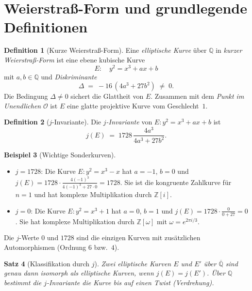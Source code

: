 \documentclass[12pt,a4paper]{amsart}
\newtheorem{theorem}{Satz}[section]
\theoremstyle{definition}
\newtheorem{definition}[theorem]{Definition}
\newtheorem{example}[theorem]{Beispiel}
\newcommand{\Z}{\mathbb{Z}}
\newcommand{\Q}{\mathbb{Q}}
\begin{document}
\section{Weierstra\ss-Form und grundlegende Definitionen}

\begin{definition}[Kurze Weierstra\ss-Form]
\label{def:weierstrass}
Eine \emph{elliptische Kurve} \"uber $\Q$ in \emph{kurzer Weierstra\ss-Form} ist
eine ebene kubische Kurve
\[
  E: \quad y^2 = x^3 + ax + b
\]
mit $a, b \in \Q$ und \emph{Diskriminante}
\[
  \Delta \;=\; -16\,(4a^3 + 27b^2) \;\ne\; 0.
\]
Die Bedingung $\Delta \ne 0$ sichert die Glattheit von $E$.
Zusammen mit dem \emph{Punkt im Unendlichen} $\mathcal{O}$ ist $E$ eine
glatte projektive Kurve vom Geschlecht~$1$.
\end{definition}

\begin{definition}[$j$-Invariante]
\label{def:j_invariant}
Die \emph{$j$-Invariante} von $E: y^2 = x^3 + ax + b$ ist
\[
  j(E) \;=\; 1728\,\frac{4a^3}{4a^3 + 27b^2}.
\]
\end{definition}

\begin{example}[Wichtige Sonderkurven]
\label{ex:special_curves}
\begin{itemize}
  \item $j = 1728$: Die Kurve $E\colon y^2 = x^3 - x$ hat $a = -1$, $b = 0$
    und $j(E) = 1728 \cdot \frac{4(-1)^3}{4(-1)^3 + 27\cdot 0} = 1728$.
    Sie ist die kongruente Zahlkurve f\"ur $n=1$ und hat komplexe Multiplikation
    durch $\Z[i]$.
  \item $j = 0$: Die Kurve $E\colon y^2 = x^3 + 1$ hat $a = 0$, $b = 1$
    und $j(E) = 1728 \cdot \frac{0}{0 + 27} = 0$.
    Sie hat komplexe Multiplikation durch $\Z[\omega]$ mit $\omega = e^{2\pi i/3}$.
\end{itemize}
Die $j$-Werte $0$ und $1728$ sind die einzigen Kurven mit zus\"atzlichen
Automorphismen (Ordnung $6$ bzw.\ $4$).
\end{example}

\begin{theorem}[Klassifikation durch $j$]
\label{thm:j_classification}
Zwei elliptische Kurven $E$ und $E'$ \"uber $\overline{\Q}$ sind genau dann
isomorph als elliptische Kurven, wenn $j(E) = j(E')$.
\"Uber $\Q$ bestimmt die $j$-Invariante die Kurve bis auf einen
\emph{Twist} (Verdrehung).
\end{theorem}
\end{document}
